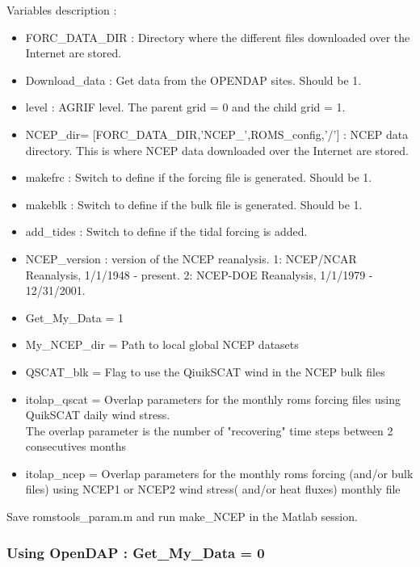 Variables description :
\begin{itemize}
\item FORC\_DATA\_DIR : Directory where the different files downloaded over 
the Internet are stored.
\item Download\_data : Get data from the OPENDAP sites. Should be 1.
\item level : AGRIF level. The parent grid = 0 and the child grid = 1.
\item NCEP\_dir= [FORC\_DATA\_DIR,'NCEP\_',ROMS\_config,'/'] : NCEP data directory. 
This is where NCEP data downloaded over the Internet are stored.
\item makefrc : Switch to define if the forcing file is generated. Should be 1.
\item makeblk : Switch to define if the bulk file is generated. Should be 1.
\item add\_tides : Switch to define if the tidal forcing is added. 
\item NCEP\_version : version of the NCEP reanalysis. 1: NCEP/NCAR Reanalysis, 1/1/1948 - present.
2: NCEP-DOE Reanalysis, 1/1/1979 - 12/31/2001.
\item Get\_My\_Data = 1
\item My\_NCEP\_dir = Path to local global NCEP datasets
\item QSCAT\_blk = Flag to use the QiuikSCAT wind in the NCEP bulk files
\item itolap\_qscat = Overlap parameters for the monthly roms forcing files using
  QuikSCAT daily wind stress.  \\
The overlap parameter is the number of "recovering"
  time steps between 2 consecutives months
\item itolap\_ncep = Overlap parameters for the monthly roms forcing (and/or bulk files) using NCEP1 or
  NCEP2 wind stress( and/or heat fluxes)  monthly file
\end{itemize}

Save romstools\_param.m and run make\_NCEP in the Matlab session.

\subsubsection{Using OpenDAP : Get\_My\_Data = 0}

